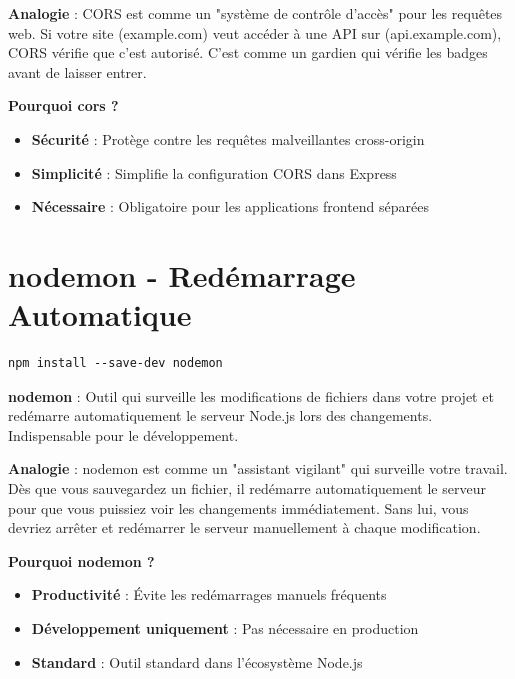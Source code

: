 \begin{analogybox}
    \textbf{Analogie} : CORS est comme un "système de contrôle d'accès" pour les requêtes web. Si votre site (example.com) veut accéder à une API sur (api.example.com), CORS vérifie que c'est autorisé. C'est comme un gardien qui vérifie les badges avant de laisser entrer.
\end{analogybox}

\textbf{Pourquoi cors ?}
\begin{itemize}
    \item \textbf{Sécurité} : Protège contre les requêtes malveillantes cross-origin
    \item \textbf{Simplicité} : Simplifie la configuration CORS dans Express
    \item \textbf{Nécessaire} : Obligatoire pour les applications frontend séparées
\end{itemize}

\section{nodemon - Redémarrage Automatique}

\begin{lstlisting}[style=bash, caption=Installation de nodemon (dépendance de développement)]
npm install --save-dev nodemon
\end{lstlisting}

\begin{definitionbox}
    \textbf{nodemon} : Outil qui surveille les modifications de fichiers dans votre projet et redémarre automatiquement le serveur Node.js lors des changements. Indispensable pour le développement.
\end{definitionbox}

\begin{analogybox}
    \textbf{Analogie} : nodemon est comme un "assistant vigilant" qui surveille votre travail. Dès que vous sauvegardez un fichier, il redémarre automatiquement le serveur pour que vous puissiez voir les changements immédiatement. Sans lui, vous devriez arrêter et redémarrer le serveur manuellement à chaque modification.
\end{analogybox}

\textbf{Pourquoi nodemon ?}
\begin{itemize}
    \item \textbf{Productivité} : Évite les redémarrages manuels fréquents
    \item \textbf{Développement uniquement} : Pas nécessaire en production
    \item \textbf{Standard} : Outil standard dans l'écosystème Node.js
\end{itemize}

